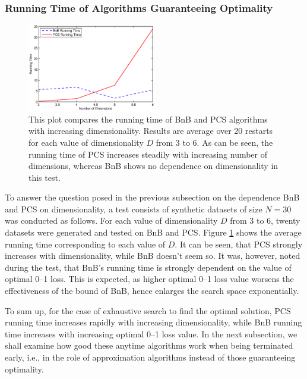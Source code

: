 \subsubsection{Running Time of Algorithms Guaranteeing Optimality}

\begin{figure}[here]
\includegraphics[width=0.50\textwidth]{images/fig62_622b.eps}
\caption{
This plot compares the running time of BnB and PCS algorithms with increasing dimensionality. Results are average over 20 restarts for each value of dimensionality $D$ from 3 to 6. As can be seen, the running time of PCS increases steadily with increasing number of dimensions, whereas BnB shows no dependence on dimensionality in this test. 
}
\label{fig:622a}
\end{figure}

To answer the question posed in the previous subsection on the dependence BnB and PCS on dimensionality, a test consists of synthetic datasets of size $N=30$ was conducted as follows. For each value of dimensionality $D$ from 3 to 6, twenty datasets were generated and tested on BnB and PCS. Figure \ref{fig:622a} shows the average running time corresponding to each value of $D$. It can be seen, that PCS strongly increases with dimensionality, while BnB doesn't seem so. It was, however, noted during the test, that BnB's running time is strongly dependent on the value of optimal 0--1 loss. This is expected, as higher optimal 0--1 loss value worsens the effectiveness of the bound of BnB, hence enlarges the search space exponentially. 

To sum up, for the case of exhaustive search to find the optimal solution, PCS running time increases rapidly with increasing dimensionality, while BnB running time increases with increasing optimal 0--1 loss value. In the next subsection, we shall examine how good these anytime algorithms work when being terminated early, i.e., in the role of approximation algorithms instead of those guaranteeing optimality.


